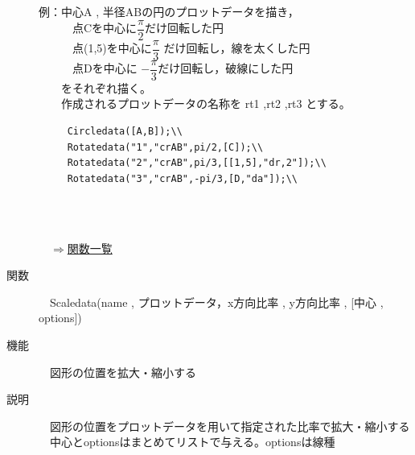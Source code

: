 \documentclass[papersize,a4paper,12pt,uplatex]{jsarticle}
\begin{document}
\begin{description}
\begin{spacing}{1.5}
例：中心A , 半径ABの円のプロットデータを描き，\\
　　　点Cを中心に$\dfrac{\pi}{2} $だけ回転した円\\
　　　点(1,5)を中心に$\dfrac{\pi}{3}$ だけ回転し，線を太くした円\\
　　　点Dを中心に $-\dfrac{\pi}{3} $だけ回転し，破線にした円\\
　　をそれぞれ描く。\\
　　作成されるプロットデータの名称を rt1 ,rt2 ,rt3 とする。
\end{spacing}
\begin{verbatim}
　　　Circledata([A,B]);\\
　　　Rotatedata("1","crAB",pi/2,[C]);\\
　　　Rotatedata("2","crAB",pi/3,[[1,5],"dr,2"]);\\
　　　Rotatedata("3","crAB",-pi/3,[D,"da"]);\\
\end{verbatim}
　\\
　　　　　　

\begin{flushright}　\hyperlink{functionlist}{$\Rightarrow$関数一覧}\end{flushright}

\hypertarget{scaledata}{}
\item[関数]　Scaledata(name , プロットデータ，x方向比率 , y方向比率 , [中心 , options])
\item[機能]　図形の位置を拡大・縮小する
\item[説明]　図形の位置をプロットデータを用いて指定された比率で拡大・縮小する\\
　中心とoptionsはまとめてリストで与える。optionsは線種\\


\end{description}
\end{document}
